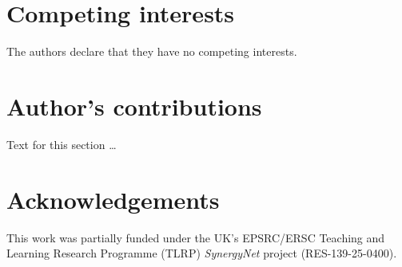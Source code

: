 \documentclass{bmcart}
\begin{document}

\begin{backmatter}

\section*{Competing interests}
  The authors declare that they have no competing interests.

\section*{Author's contributions}
    Text for this section \ldots

\section*{Acknowledgements}

This work was partially funded under the UK's EPSRC/ERSC Teaching and Learning Research Programme (TLRP) {\emph{SynergyNet}} project (RES-139-25-0400).




\end{backmatter}
\end{document}

